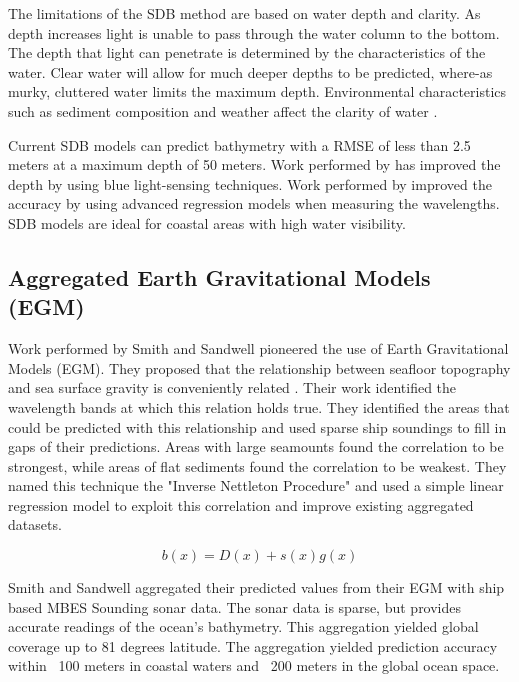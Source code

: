 \par
The limitations of the \ac{SDB} method are based on water depth and clarity.
As depth increases light is unable to pass through the water column to the bottom.
The depth that light can penetrate is determined by the characteristics of the water.
Clear water will allow for much deeper depths to be predicted, where-as murky, cluttered water limits the maximum depth.
Environmental characteristics such as sediment composition and weather affect the clarity of water \cite{vinayaraj2016satellite}.

\par
Current \ac{SDB} models can predict bathymetry with a \ac{RMSE} of less than 2.5 meters at a maximum depth of 50 meters.
Work performed by \cite{vinayaraj2016satellite} has improved the depth by using blue light-sensing techniques.
Work performed by \cite{chybicki2018three} improved the accuracy by using advanced regression models when measuring the wavelengths.
\ac{SDB} models are ideal for coastal areas with high water visibility.

\subsection{Aggregated Earth Gravitational Models (EGM)}
Work performed by Smith and Sandwell \cite{smith1994bathymetric}\cite{smith1997global} pioneered the use of Earth Gravitational Models (EGM).
They proposed that the relationship between seafloor topography and sea surface gravity is conveniently related \cite{smith1994bathymetric}.
Their work identified the wavelength bands at which this relation holds true.
They identified the areas that could be predicted with this relationship and used sparse ship soundings to fill in gaps of their predictions.
Areas with large seamounts found the correlation to be strongest, while areas of flat sediments found the correlation to be weakest.
They named this technique the "Inverse Nettleton Procedure" and used a simple linear regression model to exploit this correlation and improve existing aggregated datasets.

\begin{equation}
    b(x) = D(x) + s(x)g(x) \label{eq:egm}
\end{equation}

\par
Smith and Sandwell aggregated their predicted values from their \ac{EGM} with ship based \ac{MBES} Sounding sonar data.
The sonar data is sparse, but provides accurate readings of the ocean's bathymetry.
This aggregation yielded global coverage up to 81 degrees latitude.
The aggregation yielded prediction accuracy within ~100 meters in coastal waters and ~200 meters in the global ocean space.

